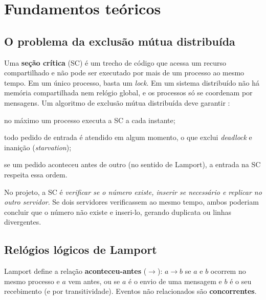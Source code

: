 \documentclass[11pt,a4paper]{article}
\begin{document}
\section{Fundamentos teóricos}
\label{sec:fundamentos}

\subsection{O problema da exclusão mútua distribuída}

Uma \textbf{seção crítica} (SC) é um trecho de código que acessa um recurso
compartilhado e não pode ser executado por mais de um processo ao mesmo tempo. Em um
único processo, basta um \emph{lock}. Em um sistema distribuído não há memória
compartilhada nem relógio global, e os processos só se coordenam por mensagens.
Um algoritmo de exclusão mútua distribuída deve garantir
\cite{coulouris}:

\begin{description}[leftmargin=1.5cm]
  \item[Segurança (\emph{safety})] no máximo um processo executa a SC a cada instante;
  \item[Vivacidade (\emph{liveness})] todo pedido de entrada é atendido em algum
        momento, o que exclui \emph{deadlock} e inanição (\emph{starvation});
  \item[Ordenação] se um pedido aconteceu antes de outro (no sentido de Lamport), a
        entrada na SC respeita essa ordem.
\end{description}

No projeto, a SC é \emph{verificar se o número existe, inserir se necessário e
replicar no outro servidor}. Se dois servidores verificassem ao mesmo tempo, ambos
poderiam concluir que o número não existe e inseri-lo, gerando duplicata ou linhas
divergentes.

\subsection{Relógios lógicos de Lamport}

Lamport \cite{lamport1978} define a relação \textbf{aconteceu-antes} ($\rightarrow$):
$a \rightarrow b$ se $a$ e $b$ ocorrem no mesmo processo e $a$ vem antes, ou se $a$
é o envio de uma mensagem e $b$ é o seu recebimento (e por transitividade). Eventos
não relacionados são \textbf{concorrentes}.
\end{document}
